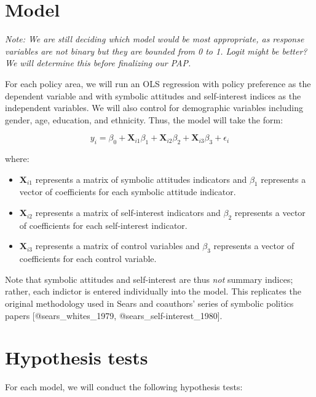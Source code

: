 \documentclass[]{article}
\begin{document}
\section{Model}\label{model}

\textit{Note: We are still deciding which model would be most appropriate, as response variables are not binary but they are bounded from 0 to 1. Logit might be better? We will determine this before finalizing our PAP.}

For each policy area, we will run an OLS regression with policy
preference as the dependent variable and with symbolic attitudes and
self-interest indices as the independent variables. We will also control
for demographic variables including gender, age, education, and
ethnicity. Thus, the model will take the form:

\begin{equation}
y_i = \beta_0 + \textbf{X}_{i1}\beta_1 + \textbf{X}_{i2}\beta_2 +  \textbf{X}_{i3}\beta_3 + \epsilon_i 
\end{equation}

where:

\begin{itemize}
  \item $\textbf{X}_{i1}$ represents a matrix of symbolic attitudes indicators and $\beta_1$ represents a vector of coefficients for each symbolic attitude indicator.
  \item $\textbf{X}_{i2}$ represents a matrix of self-interest indicators and $\beta_2$ represents a vector of coefficients for each self-interest indicator.
  \item $\textbf{X}_{i3}$ represents a matrix of control variables and $\beta_3$ represents a vector of coefficients for each control variable.
\end{itemize}

Note that symbolic attitudes and self-interest are thus \emph{not}
summary indices; rather, each indictor is entered individually into the
model. This replicates the original methodology used in Sears and
coauthors' series of symbolic politics papers {[}@sears\_whites\_1979,
@sears\_self-interest\_1980{]}.

\section{Hypothesis tests}\label{hypothesis-tests}

For each model, we will conduct the following hypothesis tests:
\end{document}
